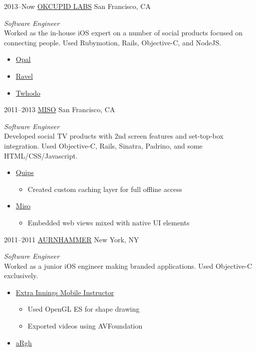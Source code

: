 \documentclass[]{friggeri-cv} %
\begin{document}
\begin{entrylist}
\entry
{2013--Now}
{\href{http://www.okcupidlabs.com/}{OKCUPID LABS}}
{San Francisco, CA}
{\emph{Software Engineer} \\
Worked as the in-house iOS expert on a number of social products focused on connecting people. Used Rubymotion, Rails, Objective-C, and NodeJS.
\begin{itemize}
\item \href{https://itunes.apple.com/us/app/opal-discover-your-world/id651756464?mt=8}{Opal}
\item \href{https://itunes.apple.com/us/app/ravel!/id610859881?mt=8}{Ravel}
\item \href{https://itunes.apple.com/us/app/twhodo/id672055708?mt=8}{Twhodo}
\end{itemize}}
\entry
{2011--2013}
{\href{http://gomiso.com/}{MISO}}
{San Francisco, CA}
{\emph{Software Engineer} \\
Developed social TV products with 2nd screen features and set-top-box integration. Used Objective-C, Rails, Sinatra, Padrino, and some HTML/CSS/Javascript.
\begin{itemize}
\item \href{https://itunes.apple.com/us/app/quips/id491880337?mt=8}{Quips}
\begin{itemize}
\item Created custom caching layer for full offline access
\end{itemize}
\item \href{https://itunes.apple.com/us/app/miso-social-tv/id352823603?mt=8}{Miso}
\begin{itemize}
\item Embedded web views mixed with native UI elements
\end{itemize}
\end{itemize}}
\entry
{2011--2011}
{\href{http://aurnhammerllc.com/}{AURNHAMMER}}
{New York, NY}
{\emph{Software Engineer} \\
Worked as a junior iOS engineer making branded applications. Used Objective-C exclusively.
\begin{itemize}
\item \href{https://itunes.apple.com/us/app/extra-innings-mobile-instructor/id446931011?mt=8}{Extra Innings Mobile Instructor}
\begin{itemize}
\item Used OpenGL ES for shape drawing
\item Exported videos using AVFoundation
\end{itemize}
\item \href{https://itunes.apple.com/us/app/argh/id461503619?mt=8}{aRgh}
\end{itemize}}
\end{entrylist}
\end{document}
